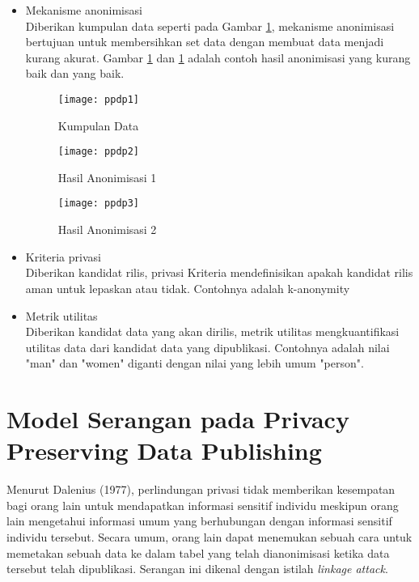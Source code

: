 \begin{itemize}

\item Mekanisme anonimisasi\\
Diberikan kumpulan data seperti pada Gambar \ref{fig:ppdp1}, mekanisme anonimisasi bertujuan untuk membersihkan set data dengan membuat data menjadi kurang akurat. Gambar \ref{fig:ppdp1} dan \ref{fig:ppdp1} adalah contoh hasil anonimisasi yang kurang baik dan yang baik.

\begin{figure}[H]
	\centering
	\texttt{[image: ppdp1]}
	\caption{Kumpulan Data}
	\label{fig:ppdp1}
\end{figure}

\begin{figure}[H]
	\centering
	\texttt{[image: ppdp2]}
	\caption{Hasil Anonimisasi 1}
	\label{fig:ppdp2}
\end{figure}

\begin{figure}[H]
	\centering
	\texttt{[image: ppdp3]}
	\caption{Hasil Anonimisasi 2}
	\label{fig:ppdp3}
\end{figure} 

\item Kriteria privasi\\
Diberikan kandidat rilis, privasi Kriteria mendefinisikan apakah kandidat rilis aman untuk lepaskan atau tidak. Contohnya adalah k-anonymity

\item Metrik utilitas\\
Diberikan kandidat data yang akan dirilis, metrik utilitas mengkuantifikasi utilitas data dari kandidat data yang dipublikasi. Contohnya adalah nilai "man" dan "women" diganti dengan nilai yang lebih umum "person".

\end{itemize}




\section{Model Serangan pada Privacy Preserving Data Publishing} 
Menurut Dalenius (1977), perlindungan privasi tidak memberikan kesempatan bagi orang lain untuk mendapatkan informasi sensitif individu meskipun orang lain mengetahui informasi umum yang berhubungan dengan informasi sensitif individu tersebut. Secara umum, orang lain dapat menemukan sebuah cara untuk memetakan sebuah data ke dalam tabel yang telah dianonimisasi ketika data tersebut telah dipublikasi. Serangan ini dikenal dengan istilah \textit{linkage attack}. 

